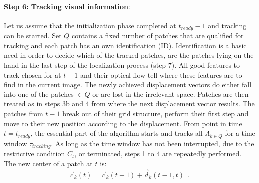 \documentclass[conference]{IEEEtran}
\begin{document}
\paragraph{Step 6: Tracking visual information:}
%
Let us assume that the initialization phase completed at $t_{ready} -1$ and tracking can be started. Set $Q$ contains a fixed number of patches that are qualified for tracking and each patch has an own identification (ID). Identification is a basic need in order to decide which of the tracked patches, are the patches lying on the hand in the last step of the localization process (step 7). All good features to track chosen for at $t-1$ and their optical flow tell where these features are to find in the current image. The newly achieved displacement vectors do either fall into one of the patches $\in Q$ or are lost in the irrelevant space. Patches are then treated as in steps 3b and 4 from where the next displacement vector results. The patches from $t-1$ break out of their grid structure, perform their first step and move to their new position according to the displacement. From point in time $t=t_{ready}$, the essential part of the algorithm starts and tracks all $\Lambda_{k \in Q} $ for a time window $\tau_{tracking}$. As long as the time window has not been interrupted, due to the restrictive condition $C_t$, or terminated, steps 1 to 4 are repeatedly performed. The new center of a patch at $t$ is:
%
\begin{equation}\label{newpos1}
	\vec{c}_k\left( t \right) = \vec{c}_k \left( t -1 \right) + \vec{d}_k\left( t -1, t\right) \enspace .
\end{equation}
\end{document}
